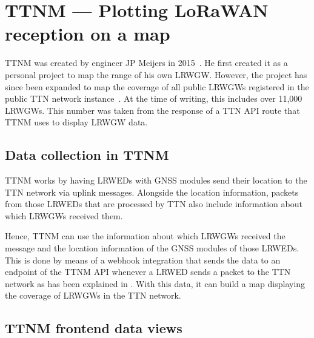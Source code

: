 \section{\acl{TTNM} — Plotting \acs{LoRaWAN} reception on a map}

\acf{TTNM} was created by engineer JP Meijers in 2015~\cite{linkedin_23_nodate}.
He first created it as a personal project to map the range of his own \acl{LRWGW}.
However, the project has since been expanded to map the coverage of all public \aclp{LRWGW} registered in the public \ac{TTN} network instance~\cite{the_things_network_jp_2018}.
At the time of writing, this includes over 11,000 \aclp{LRWGW}.
This number was taken from the response of a \ac{TTN} \ac{API} route that \ac{TTNM} uses to display \acl{LRWGW} data.

\subsection{Data collection in \acl{TTNM}}\label{sec:ttm-data-collection}

\acl{TTNM} works by having \aclp{LRWED} with \ac{GNSS} modules send their location to the \ac{TTN} network via uplink messages.
Alongside the location information, packets from those \aclp{LRWED} that are processed by \ac{TTN} also include information about which \aclp{LRWGW} received them.

Hence, \acl{TTNM} can use the information about which \aclp{LRWGW} received the message and the location information of the \ac{GNSS} modules of those \aclp{LRWED}.
This is done by means of a webhook integration that sends the data to an endpoint of the \acl{TTNM} \ac{API} whenever a \acl{LRWED} sends a packet to the \ac{TTN} network as has been explained in .
With this data, it can build a map displaying the coverage of \aclp{LRWGW} in the \ac{TTN} network.

\subsection{\acl{TTNM} frontend data views}

